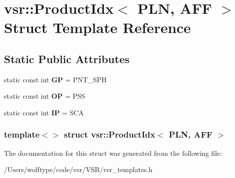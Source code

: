 \hypertarget{structvsr_1_1_product_idx_3_01_p_l_n_00_01_a_f_f_01_4}{\section{vsr\-:\-:Product\-Idx$<$ P\-L\-N, A\-F\-F $>$ Struct Template Reference}
\label{structvsr_1_1_product_idx_3_01_p_l_n_00_01_a_f_f_01_4}
}
\subsection*{Static Public Attributes}
\begin{DoxyCompactItemize}
\item 
\hypertarget{structvsr_1_1_product_idx_3_01_p_l_n_00_01_a_f_f_01_4_a3a9fd52a3962393182378430282c7d12}{static const int {\bfseries G\-P} = P\-N\-T\-\_\-\-S\-P\-H}\label{structvsr_1_1_product_idx_3_01_p_l_n_00_01_a_f_f_01_4_a3a9fd52a3962393182378430282c7d12}

\item 
\hypertarget{structvsr_1_1_product_idx_3_01_p_l_n_00_01_a_f_f_01_4_ad66165d56850f09cd572b5f1e7d2d41d}{static const int {\bfseries O\-P} = P\-S\-S}\label{structvsr_1_1_product_idx_3_01_p_l_n_00_01_a_f_f_01_4_ad66165d56850f09cd572b5f1e7d2d41d}

\item 
\hypertarget{structvsr_1_1_product_idx_3_01_p_l_n_00_01_a_f_f_01_4_a4d11989ff80eb0bf6b40b45ca67fb9be}{static const int {\bfseries I\-P} = S\-C\-A}\label{structvsr_1_1_product_idx_3_01_p_l_n_00_01_a_f_f_01_4_a4d11989ff80eb0bf6b40b45ca67fb9be}

\end{DoxyCompactItemize}
\subsubsection*{template$<$$>$ struct vsr\-::\-Product\-Idx$<$ P\-L\-N, A\-F\-F $>$}



The documentation for this struct was generated from the following file\-:\begin{DoxyCompactItemize}
\item 
/\-Users/wolftype/code/vsr/\-V\-S\-R/vsr\-\_\-templates.\-h\end{DoxyCompactItemize}
